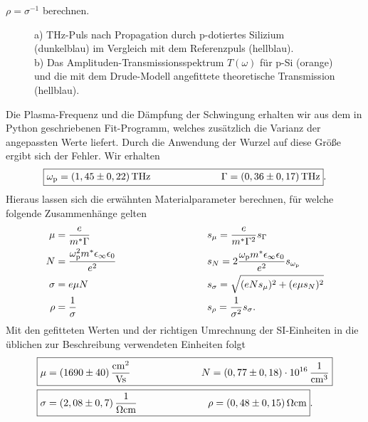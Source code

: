 $\rho = \sigma^{-1}$ berechnen.
\begin{figure}[h!]
    \centering
    \qquad
    \caption{\label{fig:pdot}a) THz-Puls nach Propagation durch p-dotiertes Silizium (dunkelblau) im Vergleich
    mit dem Referenzpuls (hellblau). \\
    b) Das Amplituden-Transmissionsspektrum $T(\omega)$ für p-Si (orange) und die mit dem 
    Drude-Modell angefittete theoretische Transmission (hellblau).}
\end{figure}\FloatBarrier
Die Plasma-Frequenz und die Dämpfung der Schwingung erhalten wir aus dem in Python geschriebenen 
Fit-Programm, welches zusätzlich die Varianz der angepassten Werte liefert. 
Durch die Anwendung der Wurzel auf diese Größe ergibt sich der Fehler. Wir erhalten
\begin{equation}
    \fbox{$\omega_{\text{p}} = (1,45\pm 0,22)\,\si{THz} \hspace{2.5cm} \Gamma = (0,36\pm 0,17)\,\si{THz}$}.
\end{equation}
Hieraus lassen sich die erwähnten Materialparameter berechnen, für welche 
folgende Zusammenhänge gelten \cite{Anleitung}
\begin{alignat*}{2}
    \mu &= \frac{e}{m^{*}\Gamma} \quad \hspace{2.5cm}
    &&s_{\mu} = \frac{e}{m^{*}\Gamma^{2}}s_{\Gamma} \\
    N &= \frac{\omega_{\text{p}}^{2}m^{*}\epsilon_{\infty}\epsilon_{0}}{e^{2}}  \quad\hspace{2.5cm}
    &&s_{N} = 2\frac{\omega_{\text{p}}m^{*}\epsilon_{\infty}\epsilon_{0}}{e^{2}}s_{\omega_{\text{p}}} \\
    \sigma &= e\mu N \quad\hspace{2.5cm}
    &&s_{\sigma} = \sqrt{(eNs_{\mu})^{2} + (e\mu s_{N})^{2}} \\
    \rho &= \frac{1}{\sigma} \quad \hspace{2.5cm}
    &&s_{\rho} = \frac{1}{\sigma^{2}}s_{\sigma}.
\end{alignat*}
Mit den gefitteten Werten und der richtigen Umrechnung der SI-Einheiten in die üblichen zur 
Beschreibung verwendeten Einheiten folgt
\begin{alignat}{2}
    \Aboxed{\mu &= (1690 \pm 40)\,\si{\frac{cm^{2}}{Vs}} \hspace{2.5cm} N = (0,77 \pm 0,18)\cdot 10^{16}\,\si{\frac{1}{cm^{3}}}} \\
    \Aboxed{\sigma &= (2,08 \pm 0,7)\,\si{\frac{1}{\ohm cm}} \hspace{2.5cm} \rho = (0,48 \pm 0,15)\,\si{\ohm cm}}.
\end{alignat}
